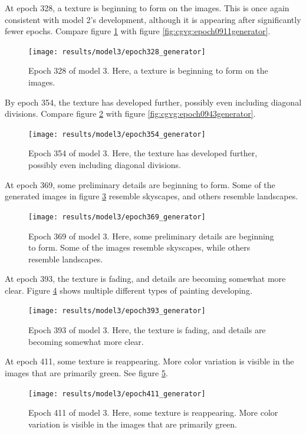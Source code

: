 \documentclass[11pt,letterpaper]{article}
\begin{document}
				At epoch 328, a texture is beginning to form on the images.
				This is once again consistent with model 2's development, although it is appearing after significantly fewer epochs.
				Compare figure \ref{fig:cgm:epoch328generator} with figure \ref{fig:cgvg:epoch0911generator}.
				\begin{figure}
					\centering
					\texttt{[image: results/model3/epoch328\_generator]}
					\caption[]{Epoch 328 of model 3. Here, a texture is beginning to form on the images.}
					\label{fig:cgm:epoch328generator}
				\end{figure}

				By epoch 354, the texture has developed further, possibly even including diagonal divisions.
				Compare figure \ref{fig:cgm:epoch354generator} with figure \ref{fig:cgvg:epoch0943generator}.
				\begin{figure}
					\centering
					\texttt{[image: results/model3/epoch354\_generator]}
					\caption[]{Epoch 354 of model 3. Here, the texture has developed further, possibly even including diagonal divisions.}
					\label{fig:cgm:epoch354generator}
				\end{figure}

				At epoch 369, some preliminary details are beginning to form.
				Some of the generated images in figure \ref{fig:cgm:epoch369generator} resemble skyscapes, and others resemble landscapes.
				\begin{figure}
					\centering
					\texttt{[image: results/model3/epoch369\_generator]}
					\caption[]{Epoch 369 of model 3. Here, some preliminary details are beginning to form. Some of the images resemble skyscapes, while others resemble landscapes.}
					\label{fig:cgm:epoch369generator}
				\end{figure}

				At epoch 393, the texture is fading, and details are becoming somewhat more clear.
				Figure \ref{fig:cgm:epoch393generator} shows multiple different types of painting developing.
				\begin{figure}
					\centering
					\texttt{[image: results/model3/epoch393\_generator]}
					\caption[]{Epoch 393 of model 3. Here, the texture is fading, and details are becoming somewhat more clear.}
					\label{fig:cgm:epoch393generator}
				\end{figure}

				At epoch 411, some texture is reappearing.
				More color variation is visible in the images that are primarily green.
				See figure \ref{fig:cgm:epoch411generator}.
				\begin{figure}
					\centering
					\texttt{[image: results/model3/epoch411\_generator]}
					\caption[]{Epoch 411 of model 3. Here, some texture is reappearing. More color variation is visible in the images that are primarily green.}
					\label{fig:cgm:epoch411generator}
				\end{figure}
\end{document}
